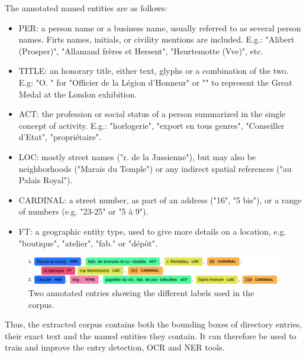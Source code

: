 The annotated named entities are as follows:

\begin{itemize}
    \item PER: a person name or a business name, usually referred to as several person names. Firts names, initials, or civility mentions are included. E.g.: "Alibert (Prosper)", "Allamand frères et Hersent", "Heurtemotte (Vve)", etc.
    \item TITLE: an honorary title, either text, glyphs or a combination of the two. E.g: "O. " for "Officier de la Légion d'Honneur" or "" to represent the Great Medal at the London exhibition.
    \item ACT: the profession or social status of a person summarized in the single concept of activity. E.g.: "horlogerie", "export en tous genres", "Conseiller d'Etat", "propriétaire".
    \item LOC: mostly street names ("r. de la Jussienne"), but may also be neighborhoods ("Marais du Temple") or any indirect spatial references ("au Palais Royal").
    \item CARDINAL: a street number, as part of an address ("16", "5 bis"), or a range of numbers (e.g. "23-25" or "5 à 9").
    \item FT: a geographic entity type, used to give more details on a location, e.g. "boutique", "atelier", "fab." or "dépôt".
\end{itemize}

\begin{figure}[htb!]
    \centering
    \includegraphics[width=\textwidth]{images/examples_labeled_entries.pdf}
    \caption{\label{fig:annotated-example}Two annotated entries showing the different labels used in the corpus.}
\end{figure}
Thus, the extracted corpus contains both the bounding boxes of directory entries, their exact text and the named entities they contain. It can therefore be used to train and improve the entry detection, OCR and NER tools.

